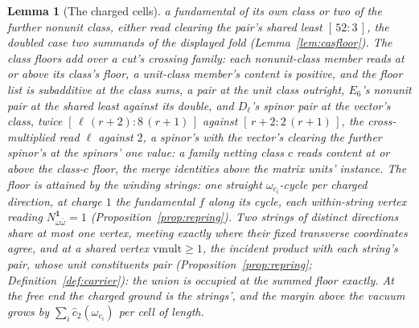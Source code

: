 \documentclass[11pt]{article}
\newtheorem{lemma}{Lemma}
\theoremstyle{definition}
\begin{document}
\begin{lemma}[The charged cells]
a fundamental of its own class or two of the further nonunit
class, either read clearing the pair's shared least
$[\,52:3\,]$, the doubled case two summands of the displayed
fold (Lemma~\ref{lem:casfloor}). The class floors add over a cut's
crossing family: each nonunit-class member reads at or above its
class's floor, a unit-class member's content is positive, and
the floor list is subadditive at the class sums, a pair at the
unit class outright, $E_6$'s nonunit pair at the shared least
against its double, and $D_\ell$'s spinor pair at the vector's
class, twice $[\,\ell\,(r+2):8\,(r+1)\,]$ against
$[\,r+2:2\,(r+1)\,]$, the cross-multiplied read $\ell$ against
$2$, a spinor's with the vector's clearing the further spinor's
at the spinors' one value: a family netting class $c$ reads
content at or above the class-$c$ floor, the merge identities
above the matrix units' instance.
The floor is attained by the \emph{winding strings}: one straight
$\omega_{c_i}$-cycle per charged direction, at charge $1$ the
fundamental $f$ along its cycle, each within-string vertex reading
$N^{\mathbf 1}_{\omega\bar\omega}=1$ (Proposition~\ref{prop:repring}). Two
strings of distinct directions share at most one vertex, meeting
exactly where their fixed transverse coordinates agree, and at a
shared vertex $\mathrm{vmult}\ge1$, the incident product with each
string's pair, whose unit constituents pair
(Proposition~\ref{prop:repring}; Definition~\ref{def:carrier}): the
union is occupied at the summed floor exactly. At the free end the charged
ground is the strings', and the margin above the vacuum grows
by $\sum_i\hat c_2(\omega_{c_i})$ per cell of length.


\end{lemma}
\end{document}

